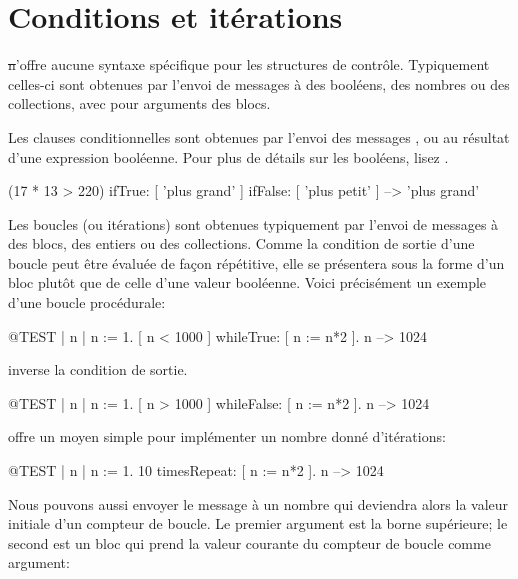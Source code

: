 \documentclass[a4paper,10pt,twoside]{book}
\begin{document}
\section{Conditions et it\'{e}rations}

\st n'offre aucune syntaxe sp\'{e}cifique pour les structures de contr\^{o}le.
Typiquement celles-ci sont obtenues par l'envoi de messages \`{a} des bool\'{e}ens, des nombres ou des collections, avec pour arguments des blocs.

Les clauses conditionnelles sont obtenues par l'envoi des messages
,  ou
 au r\'{e}sultat d'une expression
bool\'{e}enne. Pour plus de détails sur les booléens, lisez .

\begin{code}{}
(17 * 13 > 220)
   ifTrue: [ 'plus grand' ]
   ifFalse: [ 'plus petit' ] --> 'plus grand'
\end{code}

Les boucles (ou it\'{e}rations) sont obtenues typiquement par l'envoi de messages \`{a} des blocs, des entiers ou des collections.
Comme la condition de sortie d'une boucle peut \^{e}tre \'{e}valu\'{e}e de fa\c{c}on r\'{e}p\'{e}titive, elle se pr\'{e}sentera sous la forme d'un bloc plut\^{o}t que de celle d'une valeur bool\'{e}enne.
Voici pr\'{e}cis\'{e}ment un exemple d'une boucle proc\'{e}durale:

\begin{code}{@TEST | n |}
n := 1.
[ n < 1000 ] whileTrue: [ n := n*2 ].
n --> 1024
\end{code}

\noindent
{} inverse la condition de sortie.

\begin{code}{@TEST | n |}
n := 1.
[ n > 1000 ] whileFalse: [ n := n*2 ].
n --> 1024
\end{code}

\noindent
{} offre un moyen simple pour impl\'{e}menter un nombre donn\'{e} d'it\'{e}rations:
\begin{code}{@TEST | n |}
n := 1.
10 timesRepeat: [ n := n*2 ].
n --> 1024
\end{code}
Nous pouvons aussi envoyer le message  \`{a} un
nombre qui deviendra alors la valeur initiale d'un compteur de boucle.
Le premier argument est la borne sup\'{e}rieure; le second est un bloc qui prend la valeur courante du compteur de boucle comme argument:
\end{document}
